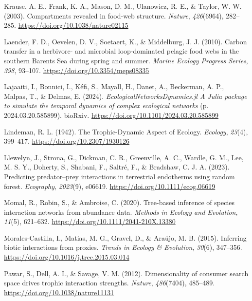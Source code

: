 \documentclass[
]{article}
\newlength{\cslhangindent}
\newenvironment{CSLReferences}[2] %
 {\begin{list}{}{%
  \setlength{\itemindent}{0pt}
  \setlength{\leftmargin}{0pt}
  \setlength{\parsep}{0pt}
  \ifodd #1
   \setlength{\leftmargin}{\cslhangindent}
   \setlength{\itemindent}{-1\cslhangindent}
  \fi
  \setlength{\itemsep}{#2\baselineskip}}}
 {\end{list}}
\begin{document}
\begin{CSLReferences}{1}{0}
Krause, A. E., Frank, K. A., Mason, D. M., Ulanowicz, R. E., \& Taylor,
W. W. (2003). Compartments revealed in food-web structure.
\emph{Nature}, \emph{426}(6964), 282--285.
\url{https://doi.org/10.1038/nature02115}

Laender, F. D., Oevelen, D. V., Soetaert, K., \& Middelburg, J. J.
(2010). Carbon transfer in a herbivore- and microbial loop-dominated
pelagic food webs in the southern {Barents Sea} during spring and
summer. \emph{Marine Ecology Progress Series}, \emph{398}, 93--107.
\url{https://doi.org/10.3354/meps08335}

Lajaaiti, I., Bonnici, I., Kéfi, S., Mayall, H., Danet, A., Beckerman,
A. P., Malpas, T., \& Delmas, E. (2024).
\emph{{EcologicalNetworksDynamics}.jl {A Julia} package to simulate the
temporal dynamics of complex ecological networks} (p.
2024.03.20.585899). bioRxiv.
\url{https://doi.org/10.1101/2024.03.20.585899}

Lindeman, R. L. (1942). The {Trophic-Dynamic Aspect} of {Ecology}.
\emph{Ecology}, \emph{23}(4), 399--417.
\url{https://doi.org/10.2307/1930126}

Llewelyn, J., Strona, G., Dickman, C. R., Greenville, A. C., Wardle, G.
M., Lee, M. S. Y., Doherty, S., Shabani, F., Saltré, F., \& Bradshaw, C.
J. A. (2023). Predicting predator--prey interactions in terrestrial
endotherms using random forest. \emph{Ecography}, \emph{2023}(9),
e06619. \url{https://doi.org/10.1111/ecog.06619}

Momal, R., Robin, S., \& Ambroise, C. (2020). Tree-based inference of
species interaction networks from abundance data. \emph{Methods in
Ecology and Evolution}, \emph{11}(5), 621--632.
\url{https://doi.org/10.1111/2041-210X.13380}

Morales-Castilla, I., Matias, M. G., Gravel, D., \& Araújo, M. B.
(2015). Inferring biotic interactions from proxies. \emph{Trends in
Ecology \& Evolution}, \emph{30}(6), 347--356.
\url{https://doi.org/10.1016/j.tree.2015.03.014}

Pawar, S., Dell, A. I., \& Savage, V. M. (2012). Dimensionality of
consumer search space drives trophic interaction strengths.
\emph{Nature}, \emph{486}(7404), 485--489.
\url{https://doi.org/10.1038/nature11131}


\end{CSLReferences}
\end{document}
